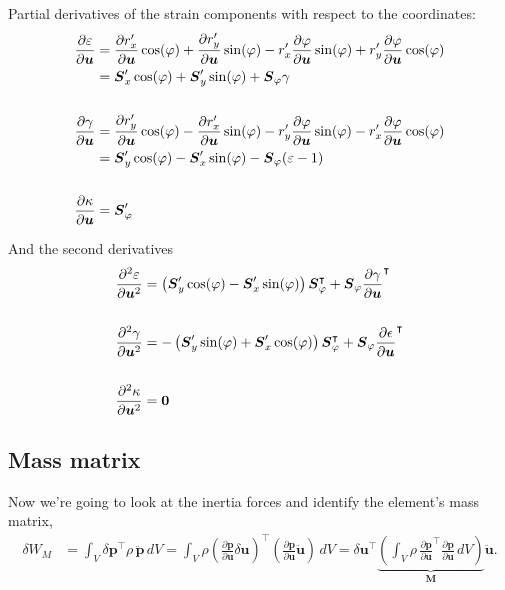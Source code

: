 Partial derivatives of the strain components with respect to the coordinates:
%
\begin{align}
\frac{\partial\varepsilon}{\partial\boldsymbol{u}} &= \frac{\partial r_x'}{\partial\boldsymbol{u}}\cos(\varphi) + \frac{\partial r_y'}{\partial\boldsymbol{u}}\sin(\varphi) - r_x' \frac{\partial\varphi}{\partial\boldsymbol{u}}\sin(\varphi) + r_y' \frac{\partial\varphi}{\partial\boldsymbol{u}}\cos(\varphi) \notag \\
&= \boldsymbol{S}_x'\cos(\varphi) + \boldsymbol{S}_y'\sin(\varphi) + \boldsymbol{S}_\varphi\gamma \\
\notag \\
\frac{\partial\gamma}{\partial\boldsymbol{u}} &= \frac{\partial r_y'}{\partial\boldsymbol{u}}\cos(\varphi) - \frac{\partial r_x'}{\partial\boldsymbol{u}}\sin(\varphi) - r_y' \frac{\partial\varphi}{\partial\boldsymbol{u}}\sin(\varphi) - r_x' \frac{\partial\varphi}{\partial\boldsymbol{u}}\cos(\varphi) \notag \\
&= \boldsymbol{S}_y'\cos(\varphi) - \boldsymbol{S}_x'\sin(\varphi) - \boldsymbol{S}_\varphi(\varepsilon - 1) \\
\notag \\
\frac{\partial\kappa}{\partial\boldsymbol{u}} &= \boldsymbol{S}_\varphi'
\end{align}

And the second derivatives
%
\begin{align}
\frac{\partial^2\varepsilon}{\partial\boldsymbol{u}^2} &= \left(\boldsymbol{S}_y'\cos(\varphi) - \boldsymbol{S}_x'\sin(\varphi)\right)\boldsymbol{S}_\varphi^\intercal + \boldsymbol{S}_\varphi\frac{\partial\gamma}{\partial\boldsymbol{u}}^\intercal \\
\notag \\
\frac{\partial^2\gamma}{\partial\boldsymbol{u}^2} &= -\left(\boldsymbol{S}_y'\sin(\varphi) + \boldsymbol{S}_x'\cos(\varphi)\right)\boldsymbol{S}_\varphi^\intercal + \boldsymbol{S}_\varphi\frac{\partial\epsilon}{\partial\boldsymbol{u}}^\intercal \\
\notag \\
\frac{\partial^2\kappa}{\partial\boldsymbol{u}^2} &= \boldsymbol{0}
\end{align}

\subsection{Mass matrix}

Now we're going to look at the inertia forces and identify the element's mass matrix,
%
\begin{align}
\delta W_{M} &= \int_{V} \delta\boldsymbol{p}^\intercal\rho\,\ddot{\boldsymbol{p}}\,dV = \int_{V} \rho\left(\frac{\partial\boldsymbol{p}}{\partial\boldsymbol{u}}\delta\boldsymbol{u}\right)^\intercal\left(\frac{\partial\boldsymbol{p}}{\partial\boldsymbol{u}}\ddot{\boldsymbol{u}}\right)\,dV = \delta\boldsymbol{u}^\intercal\underbrace{\left(\int_{V} \rho\,\frac{\partial\boldsymbol{p}}{\partial\boldsymbol{u}}^\intercal\frac{\partial\boldsymbol{p}}{\partial\boldsymbol{u}}\,dV\right)}_{\boldsymbol{M}}\ddot{\boldsymbol{u}}.
\end{align}

